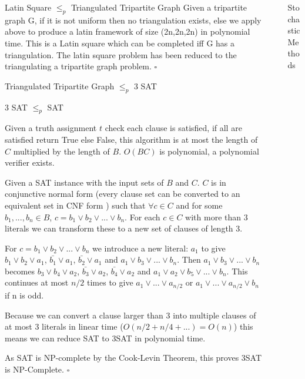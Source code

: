 \documentclass[final]{beamer}
\newlength{\sepwidth}
\newlength{\colwidth}
\newcounter{col}
\newcommand{\separatorcolumn}{\begin{column}{\sepwidth}\end{column}}
\begin{document}
\begin{frame}[t]
\begin{columns}[t]
\begin{column}{\colwidth}
\begin{block}{Latin Square $\leq_p$ Triangulated Tripartite Graph}
Given a tripartite graph G, if it is not uniform then no triangulation exists, else we apply above to produce a latin framework of size (2n,2n,2n) in polynomial time. This is a Latin square which can be completed iff G has a triangulation. The latin square problem has been reduced to the triangulating a tripartite graph problem. $\square$
  \end{block}
  \begin{block}{Triangulated Tripartite Graph $\leq_p$ 3 SAT}

  \end{block}
  \begin{block}{3 SAT $\leq_p$  SAT}

Given a truth assignment $t$ check each clause is satisfied, if all are satisfied return True else False, this algorithm is at most the length of $C$ multiplied by the length of $B$. $O(BC)$ is polynomial, a polynomial verifier exists. 

Given a SAT instance with the input sets of $B$ and $C$. $C$ is in conjunctive normal form (every clause set can be converted to an equivalent set in CNF form \cite{CNF}) such that $\forall c \in C$ and for some $b_1, ... ,b_n \in B$, $c = b_1 \lor b_2 \lor ... \lor b_n$. For each $c \in C$ with more than 3 literals we can transform these to a new set of clauses of length 3. 

For $c = b_1 \lor b_2 \lor ... \lor b_n$ we introduce a new literal: $a_1$ to give $b_1 \lor b_2 \lor a_1$, $\bar{b_1} \lor a_1$, $\bar{b_2} \lor a_1$ and $a_1 \lor b_3 \lor ... \lor b_n$. Then $a_1 \lor b_3 \lor ... \lor b_n$ becomes $b_3 \lor b_4 \lor a_2$, $\bar{b_3} \lor a_2$, $\bar{b_4} \lor a_2$ and $a_1 \lor a_2 \lor b_5 \lor ... \lor b_n$. This continues at most $n/2$ times to give $a_1 \lor ... \lor a_{n/2}$ or $a_1 \lor ... \lor a_{n/2} \lor b_n$ if n is odd. 

Because we can convert a clause larger than 3 into multiple clauses of at most 3 literals in linear time ($O(n/2 + n/4 + ...) = O(n)$) this means we can reduce SAT to 3SAT in polynomial time. 

As SAT is NP-complete by the Cook-Levin Theorem, this proves 3SAT is NP-Complete. $\square$

  \end{block}
\end{column}

\separatorcolumn

\begin{column}{\colwidth}
  \begin{exampleblock}{Stochastic Methods}
  \end{exampleblock}


\end{column}
\end{columns}
\end{frame}
\end{document}
